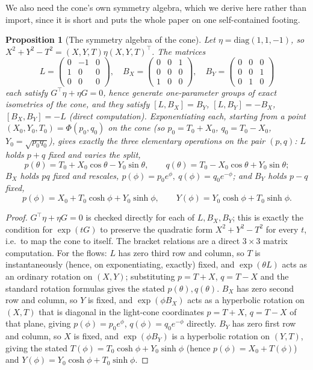 \documentclass[11pt]{amsart}
\newtheorem{proposition}[theorem]{Proposition}
\theoremstyle{remark}
\begin{document}
We also need the cone's own symmetry algebra, which we derive here rather than import, since it is short and puts the whole paper on one self-contained footing.

\begin{proposition}[The symmetry algebra of the cone]\label{thm:generators-recap}
Let $\eta=\mathrm{diag}(1,1,-1)$, so $X^2+Y^2-T^2=(X,Y,T)\eta(X,Y,T)^\top$. The matrices
\[
L=\begin{pmatrix}0&-1&0\\1&0&0\\0&0&0\end{pmatrix},\quad
B_X=\begin{pmatrix}0&0&1\\0&0&0\\1&0&0\end{pmatrix},\quad
B_Y=\begin{pmatrix}0&0&0\\0&0&1\\0&1&0\end{pmatrix}
\]
each satisfy $G^\top\eta+\eta G=0$, hence generate one-parameter groups of exact isometries of the cone, and they satisfy $[L,B_X]=B_Y$, $[L,B_Y]=-B_X$, $[B_X,B_Y]=-L$ (direct computation). Exponentiating each, starting from a point $(X_0,Y_0,T_0)=\Phi(p_0,q_0)$ on the cone (so $p_0=T_0+X_0$, $q_0=T_0-X_0$, $Y_0=\sqrt{p_0q_0}$), gives exactly the three elementary operations on the pair $(p,q)$: $L$ holds $p+q$ fixed and varies the split,
\[
p(\theta)=T_0+X_0\cos\theta-Y_0\sin\theta,\qquad q(\theta)=T_0-X_0\cos\theta+Y_0\sin\theta;
\]
$B_X$ holds $pq$ fixed and rescales, $p(\phi)=p_0e^\phi,\ q(\phi)=q_0e^{-\phi}$; and $B_Y$ holds $p-q$ fixed,
\[
p(\phi)=X_0+T_0\cosh\phi+Y_0\sinh\phi,\qquad Y(\phi)=Y_0\cosh\phi+T_0\sinh\phi.
\]
\end{proposition}

\begin{proof}
$G^\top\eta+\eta G=0$ is checked directly for each of $L,B_X,B_Y$; this is exactly the condition for $\exp(tG)$ to preserve the quadratic form $X^2+Y^2-T^2$ for every $t$, i.e.\ to map the cone to itself. The bracket relations are a direct $3\times3$ matrix computation. For the flows: $L$ has zero third row and column, so $T$ is instantaneously (hence, on exponentiating, exactly) fixed, and $\exp(\theta L)$ acts as an ordinary rotation on $(X,Y)$; substituting $p=T+X$, $q=T-X$ and the standard rotation formulas gives the stated $p(\theta),q(\theta)$. $B_X$ has zero second row and column, so $Y$ is fixed, and $\exp(\phi B_X)$ acts as a hyperbolic rotation on $(X,T)$ that is diagonal in the light-cone coordinates $p=T+X$, $q=T-X$ of that plane, giving $p(\phi)=p_0e^\phi$, $q(\phi)=q_0e^{-\phi}$ directly. $B_Y$ has zero first row and column, so $X$ is fixed, and $\exp(\phi B_Y)$ is a hyperbolic rotation on $(Y,T)$, giving the stated $T(\phi)=T_0\cosh\phi+Y_0\sinh\phi$ (hence $p(\phi)=X_0+T(\phi)$) and $Y(\phi)=Y_0\cosh\phi+T_0\sinh\phi$.
\end{proof}
\end{document}
